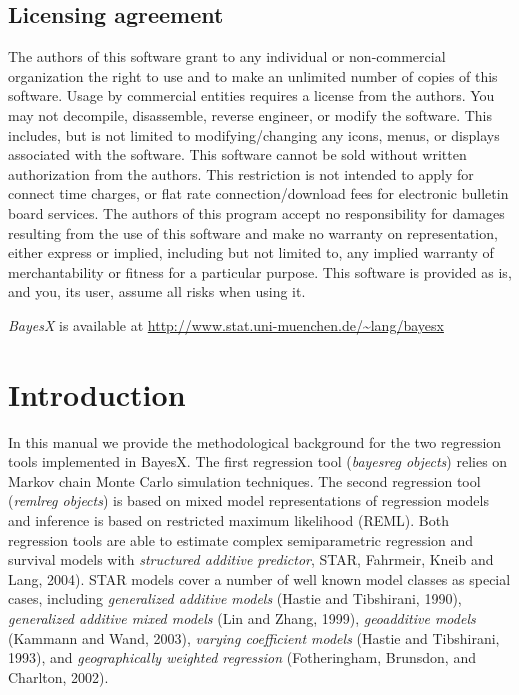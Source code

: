 \documentclass[11pt,a4paper,twoside]{bayesxarticle}
\begin{document}
\subsection*{Licensing agreement} The authors of this software grant
to any individual or non-commercial organization the right to use
and to make an unlimited number of copies of this software. Usage by
commercial entities requires a license from the authors. You may not
decompile, disassemble, reverse engineer, or modify the software.
This includes, but is not limited to modifying/changing any icons,
menus, or displays associated with the software. This software
cannot be sold without written authorization from the authors. This
restriction is not intended to apply for connect time charges, or
flat rate connection/download fees for electronic bulletin board
services. The authors of this program accept no responsibility for
damages resulting from the use of this software and make no warranty
on representation, either express or implied, including but not
limited to, any implied warranty of merchantability or fitness for a
particular purpose. This software is provided as is, and you, its
user, assume all risks when using it.

\vspace{0.5cm}

{\em BayesX} is available at {
\href{http://www.stat.uni-muenchen.de/~lang/bayesx}{http://www.stat.uni-muenchen.de/\~{}lang/bayesx}}

\newpage

\section{Introduction}

In this manual we provide the methodological background for the two
regression tools implemented in BayesX. The first regression tool
({\em bayesreg objects}) relies on Markov chain Monte Carlo
simulation techniques. The second regression tool ({\em remlreg
objects}) is based on mixed model representations of regression
models and inference is based on restricted maximum likelihood
(REML). Both regression tools are able to estimate complex
semiparametric regression and survival models with {\em structured
additive predictor}, STAR, Fahrmeir, Kneib and Lang, 2004). STAR
models cover a number of well known model classes as special cases,
including {\em generalized additive models} (Hastie and Tibshirani,
1990), {\em generalized additive mixed models} (Lin and Zhang,
1999), {\em geoadditive models} (Kammann and Wand, 2003), {\em
varying coefficient models} (Hastie and Tibshirani, 1993), and {\em
geographically weighted regression} (Fotheringham, Brunsdon, and
Charlton, 2002).
\end{document}
